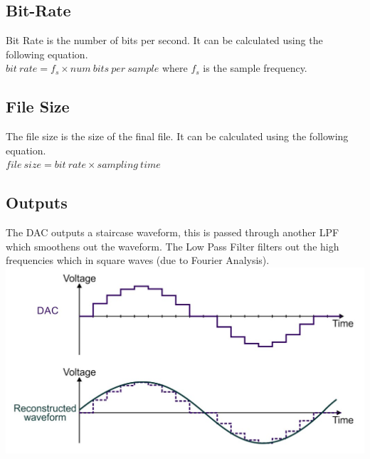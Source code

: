 \documentclass[a4paper,11pt, twocolumn]{article}
\begin{document}
\subsection{Bit-Rate}
Bit Rate is the number of bits per second. It can be calculated using the following equation.\\
$bit\ rate = f_s \times num\ bits\ per\ sample$ where $f_s$ is the sample frequency. 
\subsection{File Size}
The file size is the size of the final file. It can be calculated using the following equation.\\
$file\ size = bit\ rate \times sampling\ time$
\subsection{Outputs}
The DAC outputs a staircase waveform, this is passed through another LPF which smoothens out the waveform. The Low Pass Filter filters out the high frequencies which in square waves (due to Fourier Analysis).
\includegraphics[width=\linewidth]{output.jpg}
\end{document}
